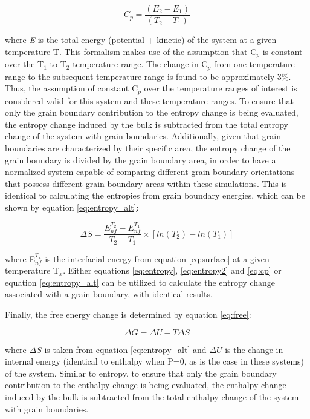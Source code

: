 \documentclass[review]{elsarticle}
\begin{document}
\begin{equation}
\label{eq:cp}
C_{p} = \frac{(E_{2} - E_{1})}{(T_{2} - T_{1})} 
\end{equation}

where \textit{E} is the total energy (potential + kinetic) of the system at a given temperature T. This formalism makes use of the assumption that C$_{p}$ is constant over the T$_{1}$ to T$_{2}$ temperature range. The change in C$_{p}$ from one temperature range to the subsequent temperature range is found to be approximately 3$\%$. Thus, the assumption of constant C$_{p}$ over the temperature ranges of interest is considered valid for this system and these temperature ranges. To ensure that only the grain boundary contribution to the entropy change is being evaluated, the entropy change induced by the bulk is subtracted from the total entropy change of the system with grain boundaries. Additionally, given that grain boundaries are characterized by their specific area, the entropy change of the grain boundary is divided by the grain boundary area, in order to have a normalized system capable of comparing different grain boundary orientations that possess different grain boundary areas within these simulations. This is identical to calculating the entropies from grain boundary energies, which can be shown by equation \ref{eq:entropy_alt}:

\begin{equation}
\label{eq:entropy_alt}
\Delta S =\frac{ E_{nf}^{T_2} - E_{nf}^{T_1}}{T_2 - T_1} \times [ ln(T_2) - ln(T_1) ]
\end{equation}

where E$_{nf}^{T_{x}}$ is the interfacial energy from equation \ref{eq:surface} at a given temperature T$_x$. Either equations \ref{eq:entropy}, \ref{eq:entropy2} and \ref{eq:cp} or equation \ref{eq:entropy_alt} can be utilized to calculate the entropy change associated with a grain boundary, with identical results. 

Finally, the free energy change is determined by equation \ref{eq:free}:

\begin{equation}
\label{eq:free}
\Delta G = \Delta U - T \Delta S
\end{equation}

where $\Delta S$ is taken from equation \ref{eq:entropy_alt} and $\Delta U$ is the change in internal energy (identical to enthalpy when P=0, as is the case in these systems) of the system. Similar to entropy, to ensure that only the grain boundary contribution to the enthalpy change is being evaluated, the enthalpy change induced by the bulk is subtracted from the total enthalpy change of the system with grain boundaries.
\end{document}
